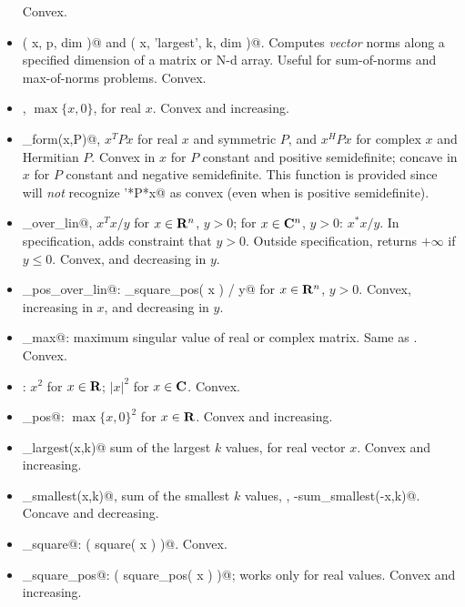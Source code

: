 \documentclass[12pt]{article}
\begin{document}
\begin{itemize}
Convex.
\item \verb@norms( x, p, dim )@ and \verb@norms( x, 'largest', k, dim )@.
Computes \emph{vector} norms along a specified dimension of a matrix
or N-d array. Useful for sum-of-norms and max-of-norms problems.
Convex.
\item \verb@pos@, $\max\{x,0\}$, for real $x$. 
Convex and increasing.
\item \verb@quad_form(x,P)@, $x^TPx$ for real $x$ and symmetric $P$,
and $x^HPx$ for complex $x$ and Hermitian $P$.
Convex in $x$ for $P$ constant and positive semidefinite;
concave in $x$ for $P$ constant and negative semidefinite.
This function is provided since \cvx will \emph{not}
recognize \verb@x'*P*x@ as convex (even when \verb@P@ is 
positive semidefinite).
\item \verb@quad_over_lin@, $x^Tx/y$ for $x \in \R^n$, $y >0$;
for $x \in \mathbf{C}^n$, $y>0$: $x^*x/y$.  In \cvx specification,
adds constraint that $y>0$.  Outside \cvx specification,
returns $+\infty$ if $y\leq 0$.
Convex, and decreasing in $y$.
\item \verb@quad_pos_over_lin@: \verb@sum_square_pos( x ) / y@
for $x\in\R^n$, $y>0$.
Convex, increasing in $x$, and decreasing in $y$.
\item \verb@sigma_max@: maximum singular value of real or 
complex matrix.  Same as \verb@norm@.  Convex.
\item \verb@square@: $x^2$ for $x \in \R$;
$|x|^2$ for $x \in \mathbf{C}$.
Convex.
\item \verb@square_pos@: $\max\{x,0\}^2$ for $x\in\R$.
Convex and increasing.
\item \verb@sum_largest(x,k)@ sum of the largest $k$ values, for
real vector $x$.
Convex and increasing.
\item \verb@sum_smallest(x,k)@, sum of the smallest $k$ values,
\ie, \verb@-sum_smallest(-x,k)@.
Concave and decreasing.
\item \verb@sum_square@: \verb@sum( square( x ) )@. Convex.
\item \verb@sum_square_pos@: \verb@sum( square_pos( x ) )@; 
works only for real values. Convex and increasing.
\end{itemize}
\end{document}
